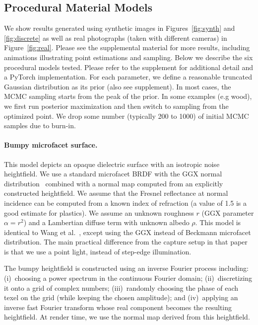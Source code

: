 



\subsection{Procedural Material Models}
\label{ssec:proc_models}
%
We show results generated using synthetic images in Figures~\ref{fig:synth} and \ref{fig:discrete} as well as real photographs (taken with different cameras) in Figure~\ref{fig:real}.
Please see the supplemental material for more results, including animations illustrating point estimations and sampling. Below we describe the six procedural models tested. Please refer to the supplement for additional detail and a \textsf{PyTorch} implementation. For each parameter, we define a reasonable truncated Gaussian distribution as its prior (also see supplement). In most cases, the MCMC sampling starts from the peak of the prior. In some examples (e.g wood), we first run posterior maximization and then switch to sampling from the optimized point. We drop some number (typically 200 to 1000) of initial MCMC samples due to burn-in.

\paragraph*{Bumpy microfacet surface.}
This model depicts an opaque dielectric surface with an isotropic noise heightfield. We use a standard microfacet BRDF with the GGX normal distribution~\cite{Walter2007} combined with a normal map computed from an explicitly constructed heightfield. We assume that the Fresnel reflectance at normal incidence can be computed from a known index of refraction (a value of 1.5 is a good estimate for plastics). We assume an unknown roughness $r$ (GGX parameter $\alpha=r^2$) and a Lambertian diffuse term with unknown albedo $\rho$. This model is identical to Wang et al.~\cite{Wang2011}, except using the GGX instead of Beckmann microfacet distribution. The main practical difference from the capture setup in that paper is that we use a point light, instead of step-edge illumination.

The bumpy heightfield is constructed using an inverse Fourier process including: (i)~choosing a power spectrum in the continuous Fourier domain; (ii)~discretizing it onto a grid of complex numbers; (iii)~randomly choosing the phase of each texel on the grid (while keeping the chosen amplitude); and (iv)~applying an inverse fast Fourier transform whose
real component becomes the resulting heightfield.
At render time, we use the normal map derived from this heightfield.

